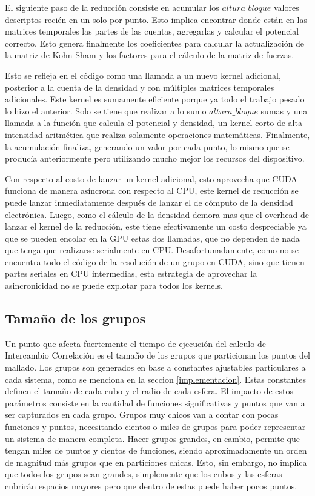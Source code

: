 El siguiente paso de la reducci\'on consiste en acumular los $altura\_bloque$ valores descriptos
reci\'en en un solo por punto. Esto implica encontrar donde est\'an en las matrices temporales las
partes de las cuentas, agregarlas y calcular el potencial correcto. Esto genera finalmente los
coeficientes para calcular la actualizaci\'on de la matriz de Kohn-Sham y los factores para el
c\'alculo de la matriz de fuerzas.

Esto se refleja en el c\'odigo como una llamada a un nuevo kernel adicional, posterior a la
cuenta de la densidad y con m\'ultiples matrices temporales adicionales. Este kernel es sumamente
eficiente porque ya todo el trabajo pesado lo hizo el anterior. Solo se tiene que realizar
a lo sumo $altura\_bloque$ sumas y una llamada a la funci\'on que calcula el potencial y densidad,
un kernel corto de alta intensidad aritm\'etica que realiza solamente operaciones matem\'aticas.
Finalmente, la acumulaci\'on finaliza, generando un valor por cada punto, lo mismo que se produc\'ia
anteriormente pero utilizando mucho mejor los recursos del dispositivo.

Con respecto al costo de lanzar un kernel adicional, esto aprovecha que CUDA funciona de manera as\'incrona
con respecto al CPU, este kernel de reducci\'on se puede lanzar inmediatamente despu\'es de lanzar el
de c\'omputo de la densidad electr\'onica. Luego, como el c\'alculo de la densidad demora mas que
el overhead de lanzar el kernel de la reducci\'on, este tiene efectivamente un costo despreciable
ya que se pueden encolar en la GPU estas dos llamadas, que no dependen de nada que tenga que realizarse serialmente en CPU.
Desafortunadamente, como no se encuentra todo el c\'odigo de la resoluci\'on de un grupo en CUDA,
sino que tienen partes seriales en CPU intermedias, esta estrategia de aprovechar la asincronicidad
no se puede explotar para todos los kernels.


\subsection{Tama\~no de los grupos}
Un punto que afecta fuertemente el tiempo de ejecuci\'on del calculo de Intercambio Correlaci\'on
es el tama\~no de los grupos que particionan los puntos del mallado. Los grupos son generados
en base a constantes ajustables particulares a cada sistema, como se menciona en la seccion \ref{implementacion}.
Estas constantes definen el tama\~no de cada cubo y el radio de cada esfera. El impacto de
estos par\'ametros consiste en la cantidad de funciones significativas y puntos que van a ser
capturados en cada grupo. Grupos muy chicos van a contar con pocas funciones y puntos, necesitando
cientos o miles de grupos para poder representar un sistema de manera completa. Hacer grupos grandes,
en cambio, permite que tengan miles de puntos y cientos de funciones, siendo aproximadamente un orden
de magnitud m\'as grupos que en particiones chicas. Esto, sin embargo, no implica que todos
los grupos sean grandes, simplemente que los cubos y las esferas cubrir\'an espacios mayores
pero que dentro de estas puede haber pocos puntos.




